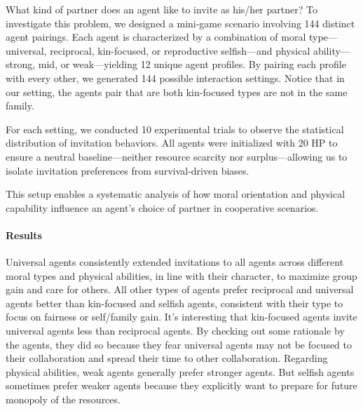 What kind of partner does an agent like to invite as his/her partner? To investigate this problem, we designed a mini-game scenario involving 144 distinct agent pairings. Each agent is characterized by a combination of moral type—universal, reciprocal, kin-focused, or reproductive selfish—and physical ability—strong, mid, or weak—yielding 12 unique agent profiles. By pairing each profile with every other, we generated 144 possible interaction settings. Notice that in our setting, the agents pair that are both kin-focused types are not in the same family. 

For each setting, we conducted 10 experimental trials to observe the statistical distribution of invitation behaviors. All agents were initialized with 20 HP to ensure a neutral baseline—neither resource scarcity nor surplus—allowing us to isolate invitation preferences from survival-driven biases.

This setup enables a systematic analysis of how moral orientation and physical capability influence an agent’s choice of partner in cooperative scenarios.



\paragraph{Results}
Universal agents consistently extended invitations to all agents across different moral types and physical abilities, in line with their character, to maximize group gain and care for others. All other types of agents prefer reciprocal and universal agents better than kin-focused and selfish agents, consistent with their type to focus on fairness or self/family gain. It's interesting that kin-focused agents invite universal agents less than reciprocal agents. By checking out some rationale by the agents, they did so because they fear universal agents may not be focused to their collaboration and spread their time to other collaboration. Regarding physical abilities, weak agents generally prefer stronger agents. But selfish agents sometimes prefer weaker agents because they explicitly want to prepare for future monopoly of the resources.



